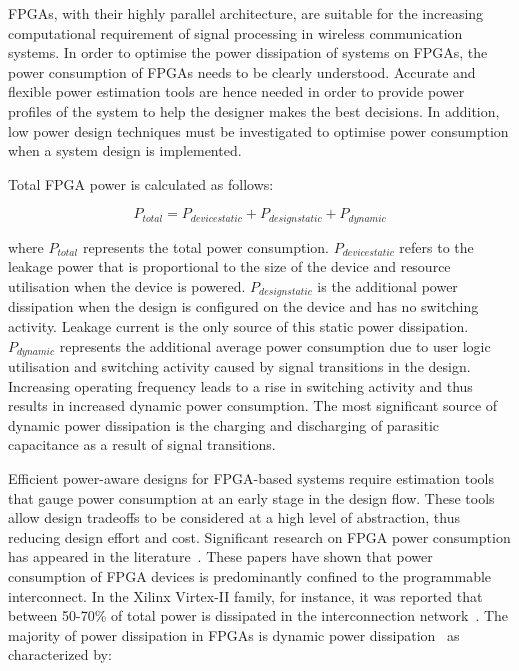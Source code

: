 FPGAs, with their highly parallel architecture, are suitable for the increasing computational requirement of signal processing in wireless communication systems.
In order to optimise the power dissipation of systems on FPGAs, the power consumption of FPGAs needs to be clearly understood.
Accurate and flexible power estimation tools are hence needed in order to provide power profiles of the system to help the designer makes the best decisions.
In addition, low power design techniques must be investigated to optimise power consumption when a system design is implemented.

Total FPGA power is calculated as follows:
\begin{center}
\begin{equation}
\label{Equ:Ptotal}
 P_{\mathit{total}} = P_{\mathit{device static}} + P_{\mathit{design static}} + P_{\mathit{dynamic}}
\end{equation}
\end{center}
where $P_{\mathit{total}}$ represents the total power consumption. $P_{\mathit{device static}}$ refers to the leakage power that is proportional to the size of the device and resource utilisation when the device is powered. $P_{\mathit{design static}}$ is the additional power dissipation when the design is configured on the device and has no switching activity. Leakage current is the only source of this static power dissipation.
$P_{\mathit{dynamic}}$ represents the additional average power consumption due to user logic utilisation and switching activity caused by signal transitions in the design. Increasing operating frequency leads to a rise in switching activity and thus results in increased dynamic power consumption. The most significant source of dynamic power dissipation is the charging and discharging of parasitic capacitance as a result of signal transitions.

Efficient power-aware designs for FPGA-based systems require estimation tools that gauge power consumption at an early stage in the design flow.
These tools allow design tradeoffs to be considered at a high level of abstraction, thus reducing design effort and cost.
Significant research on FPGA power consumption has appeared in the literature~\cite{Shang2002,Anderson2004a,Anderson2004,Todorovich2005,Reimer2006}.
These papers have shown that power consumption of FPGA devices is predominantly confined to the programmable interconnect.
In the Xilinx Virtex-II family, for instance, it was reported that between 50-70\% of total power is dissipated in the interconnection network~\cite{Shang2002}.
The majority of power dissipation in FPGAs is dynamic power dissipation~\cite{Shang2002} as characterized by:

